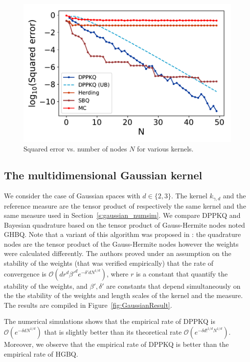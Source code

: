 \documentclass[twoside,11pt]{book}
\numberwithin{theorem}{chapter}
\numberwithin{definition}{chapter}
\numberwithin{proposition}{chapter}
\numberwithin{corollary}{chapter}
\numberwithin{example}{chapter}
\numberwithin{lemma}{chapter}
\begin{document}
\begin{figure}
    \centering
\includegraphics[width=\textwidth]{img/neurips/GaussianKernel/Gaussian_kernel_scale_05_a_025_fig_4}
\caption{Squared error vs. number of nodes $N$ for various kernels.
\label{fig:results}}
\end{figure} 


\subsection{The multidimensional Gaussian kernel}\label{s:multigaussian_numsim}

We consider the case of Gaussian spaces with $d \in \{2,3\}$. The kernel $k_{\gamma,d}$ and the reference measure are the tensor product of respectively the same kernel and the same measure used in Section~\ref{s:gaussian_numsim}. We compare DPPKQ and Bayesian quadrature based on the tensor product of Gauss-Hermite nodes noted GHBQ. Note that a variant of this algorithm was proposed in \citep{KaSa19}: the quadrature nodes are the tensor product of the Gauss-Hermite nodes however the weights were calculated differently. The authors proved under an assumption on the stability of the weights (that was verified empirically) that the rate of convergence is $\mathcal{O}(dr^{d}\beta'^{d}e^{-\delta' d N^{1/d}})$, where $r$ is a constant that quantify the stability of the weights, and $\beta',\delta'$ are constants that depend simultaneously on the the stability of the weights and length scales of the kernel and the measure. The results are compiled in Figure~\ref{fig:GaussianResult}.

The numerical simulations shows that the empirical rate of DPPKQ is $\mathcal{O}(e^{-\delta d N^{1/d}})$ that is slightly better than its theoretical rate $\mathcal{O}(e^{-\delta d!^{1/d} N^{1/d}})$. Moreover, we observe that the empirical rate of DPPKQ is better than the empirical rate of HGBQ.
\end{document}
